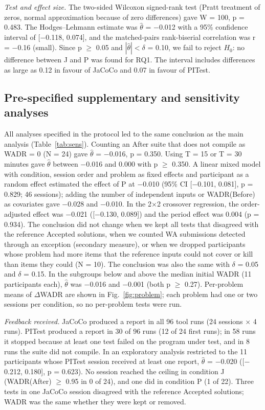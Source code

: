 \textit{Test and effect size.}
The two-sided Wilcoxon signed-rank test (Pratt treatment of zeros, normal approximation because of zero differences) gave W = 100, p = 0.483.
The Hodges--Lehmann estimate was $\hat{\theta}$ = $-$0.012 with a 95\% confidence interval of [$-$0.118, 0.074], and the matched-pairs rank-biserial correlation was r = $-$0.16 (small).
Since p $\geq$ 0.05 and $|\hat{\theta}| < \delta$ = 0.10, we fail to reject $H_0$: no difference between J and P was found for RQ1.
The interval includes differences as large as 0.12 in favour of JaCoCo and 0.07 in favour of PITest.

\subsection{Pre-specified supplementary and sensitivity analyses}
All analyses specified in the protocol led to the same conclusion as the main analysis (Table~\ref{tab:sens}).
Counting an After suite that does not compile as WADR = 0 (N = 24) gave $\hat{\theta}$ = $-$0.016, p = 0.350.
Using T = 15 or T = 30 minutes gave $\hat{\theta}$ between $-$0.016 and 0.000 with p $\geq$ 0.350.
A linear mixed model with condition, session order and problem as fixed effects and participant as a random effect estimated the effect of P at $-$0.010 (95\% CI [$-$0.101, 0.081], p = 0.829; 46 sessions); adding the number of independent inputs or WADR(Before) as covariates gave $-$0.028 and $-$0.010.
In the 2$\times$2 crossover regression, the order-adjusted effect was $-$0.021 ([$-$0.130, 0.089]) and the period effect was 0.004 (p = 0.934).
The conclusion did not change when we kept all tests that disagreed with the reference Accepted solutions, when we counted WA submissions detected through an exception (secondary measure), or when we dropped participants whose problem had more items that the reference inputs could not cover or kill than items they could (N = 10).
The conclusion was also the same with $\delta$ = 0.05 and $\delta$ = 0.15.
In the subgroups below and above the median initial WADR (11 participants each), $\hat{\theta}$ was $-$0.016 and $-$0.001 (both p $\geq$ 0.27).
Per-problem means of $\Delta$WADR are shown in Fig.~\ref{fig:problem}; each problem had one or two sessions per condition, so no per-problem tests were run.

\textit{Feedback received.} JaCoCo produced a report in all 96 tool runs (24 sessions $\times$ 4 runs).
PITest produced a report in 30 of 96 runs (12 of 24 first runs); in 58 runs it stopped because at least one test failed on the program under test, and in 8 runs the suite did not compile.
In an exploratory analysis restricted to the 11 participants whose PITest session received at least one report, $\hat{\theta}$ = $-$0.020 ([$-$0.212, 0.180], p = 0.623).
No session reached the ceiling in condition J (WADR(After) $\geq$ 0.95 in 0 of 24), and one did in condition P (1 of 22).
Three tests in one JaCoCo session disagreed with the reference Accepted solutions; WADR was the same whether they were kept or removed.

